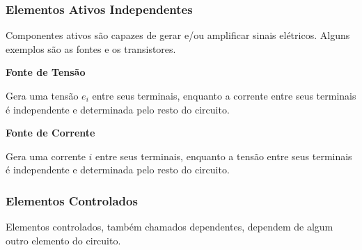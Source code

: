 \documentclass{article}
\numberwithin{equation}{section}
\newlength\Colsep
\begin{document}
\justifying
\subsubsection{Elementos Ativos Independentes}
\label{subsubsec:ativos}

Componentes ativos são capazes de gerar e/ou amplificar sinais elétricos. Alguns exemplos são as fontes e os transistores.

\vspace{3mm}

\begin{minipage}[c][5cm]{\dimexpr0.45\textwidth-0.5\Colsep\relax}
    \begin{center}{\textbf{Fonte de Tensão}}\end{center}

    Gera uma tensão $e_i$ entre seus terminais, enquanto a corrente entre seus terminais é independente e determinada pelo resto do circuito.
\end{minipage} \hfill
\begin{minipage}[c][2cm][c]{\dimexpr0.05\textwidth-0.5\Colsep\relax}

\end{minipage} \hfill
\begin{minipage}[c][5cm]{\dimexpr0.45\textwidth-0.5\Colsep\relax}
    \begin{center}{\textbf{Fonte de Corrente}}\end{center}

    Gera uma corrente $i$ entre seus terminais, enquanto a tensão entre seus terminais é independente e determinada pelo resto do circuito.
\end{minipage} \hfill
\justifying
\subsubsection{Elementos Controlados}
\label{subsubsec:controlados}
Elementos controlados, também chamados dependentes, dependem de algum outro elemento do circuito.
\end{document}
